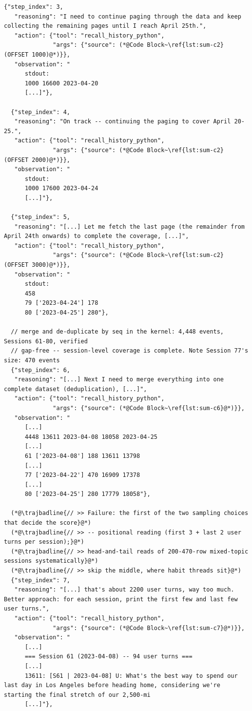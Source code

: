 \begin{lstlisting}[style=traj]
  {"step_index": 3,
   "reasoning": "I need to continue paging through the data and keep collecting the remaining pages until I reach April 25th.",
   "action": {"tool": "recall_history_python",
              "args": {"source": (*@Code Block~\ref{lst:sum-c2} (OFFSET 1000)@*)}},
   "observation": "
      stdout:
      1000 16600 2023-04-20
      [...]"},

  {"step_index": 4,
   "reasoning": "On track -- continuing the paging to cover April 20-25.",
   "action": {"tool": "recall_history_python",
              "args": {"source": (*@Code Block~\ref{lst:sum-c2} (OFFSET 2000)@*)}},
   "observation": "
      stdout:
      1000 17600 2023-04-24
      [...]"},

  {"step_index": 5,
   "reasoning": "[...] Let me fetch the last page (the remainder from April 24th onwards) to complete the coverage, [...]",
   "action": {"tool": "recall_history_python",
              "args": {"source": (*@Code Block~\ref{lst:sum-c2} (OFFSET 3000)@*)}},
   "observation": "
      stdout:
      458
      79 ['2023-04-24'] 178
      80 ['2023-04-25'] 280"},

  // merge and de-duplicate by seq in the kernel: 4,448 events, Sessions 61-80, verified
  // gap-free -- session-level coverage is complete. Note Session 77's size: 470 events
  {"step_index": 6,
   "reasoning": "[...] Next I need to merge everything into one complete dataset (deduplication), [...]",
   "action": {"tool": "recall_history_python",
              "args": {"source": (*@Code Block~\ref{lst:sum-c6}@*)}},
   "observation": "
      [...]
      4448 13611 2023-04-08 18058 2023-04-25
      [...]
      61 ['2023-04-08'] 188 13611 13798
      [...]
      77 ['2023-04-22'] 470 16909 17378
      [...]
      80 ['2023-04-25'] 280 17779 18058"},

  (*@\trajbadline{// >> Failure: the first of the two sampling choices that decide the score}@*)
  (*@\trajbadline{// >> -- positional reading (first 3 + last 2 user turns per session);}@*)
  (*@\trajbadline{// >> head-and-tail reads of 200-470-row mixed-topic sessions systematically}@*)
  (*@\trajbadline{// >> skip the middle, where habit threads sit}@*)
  {"step_index": 7,
   "reasoning": "[...] that's about 2200 user turns, way too much. Better approach: for each session, print the first few and last few user turns.",
   "action": {"tool": "recall_history_python",
              "args": {"source": (*@Code Block~\ref{lst:sum-c7}@*)}},
   "observation": "
      [...]
      === Session 61 (2023-04-08) -- 94 user turns ===
      [...]
      13611: [S61 | 2023-04-08] U: What's the best way to spend our last day in Los Angeles before heading home, considering we're starting the final stretch of our 2,500-mi
      [...]"},


\end{lstlisting}
